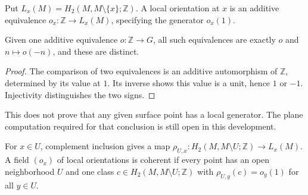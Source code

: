 \begin{definition}\label{def:local-orientation}

  Put $L_x(M)=H_2(M,M\setminus\{x\};\mathbb Z)$.
  A local orientation at $x$ is an additive equivalence
  $o_x:\mathbb Z\to L_x(M)$, specifying the generator $o_x(1)$.
\end{definition}

\begin{lemma}\label{lem:two-local-generators}

  Given one additive equivalence $o:\mathbb Z\to G$, all such equivalences
  are exactly $o$ and $n\mapsto o(-n)$, and these are distinct.
\end{lemma}
\begin{proof}

  The comparison of two equivalences is an additive automorphism of
  $\mathbb Z$, determined by its value at $1$. Its inverse shows this value
  is a unit, hence $1$ or $-1$. Injectivity distinguishes the two signs.
\end{proof}
This does not prove that any given surface point has a local generator.
The plane computation required for that conclusion is still open in this development.

\begin{definition}\label{def:coherent-orientation}

  For $x\in U$, complement inclusion gives a map
  $\rho_{U,x}:H_2(M,M\setminus U;\mathbb Z)\to L_x(M)$.
  A field $(o_x)$ of local orientations is coherent if every point has an
  open neighborhood $U$ and one class $c\in H_2(M,M\setminus U;\mathbb Z)$
  with $\rho_{U,y}(c)=o_y(1)$ for all $y\in U$.
\end{definition}

